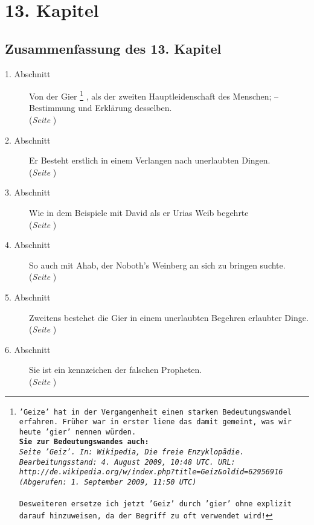 
\chapter{13. Kapitel} \label{kap13}

\section{Zusammenfassung des 13. Kapitel}

\begin{description}
\item[1. Abschnitt]  Von der Gier
\footnote{\texttt{'Geize' hat in der Vergangenheit einen starken Bedeutungswandel erfahren. Früher war in erster liene das damit gemeint, was wir heute 'gier' nennen würden.
\\ \textbf{Sie zur Bedeutungswandes auch:}
\\ \textit{Seite 'Geiz'. In: Wikipedia, Die freie Enzyklopädie. Bearbeitungsstand: 4. August 2009, 10:48 UTC. URL:
\\ http://de.wikipedia.org/w/index.php?title=Geiz\&oldid=62956916
\\ (Abgerufen: 1. September 2009, 11:50 UTC) }
\\ \\ Desweiteren ersetze ich jetzt 'Geiz' durch 'gier' ohne explizit darauf hinzuweisen, da der Begriff zu oft verwendet wird!}}
, als der zweiten Hauptleidenschaft des Menschen;
-- Bestimmung und Erklärung desselben.
\\(\textit{Seite \pageref{kap13_ab1}})
\item[2. Abschnitt] Er Besteht erstlich in einem Verlangen nach unerlaubten
Dingen.
\\(\textit{Seite \pageref{kap13_ab2}})
\item[3. Abschnitt] Wie in dem Beispiele mit David als er Urias Weib begehrte
\\(\textit{Seite \pageref{kap13_ab3}})
\item[4. Abschnitt] So auch mit Ahab, der Noboth's Weinberg an sich zu bringen
suchte.
\\(\textit{Seite \pageref{kap13_ab4}})
\item[5. Abschnitt] Zweitens bestehet die Gier in einem unerlaubten Begehren
erlaubter Dinge.
\\(\textit{Seite \pageref{kap13_ab5}})
\item[6. Abschnitt] Sie ist ein kennzeichen der falschen Propheten.
\\(\textit{Seite \pageref{kap13_ab6}})

\end{description}
